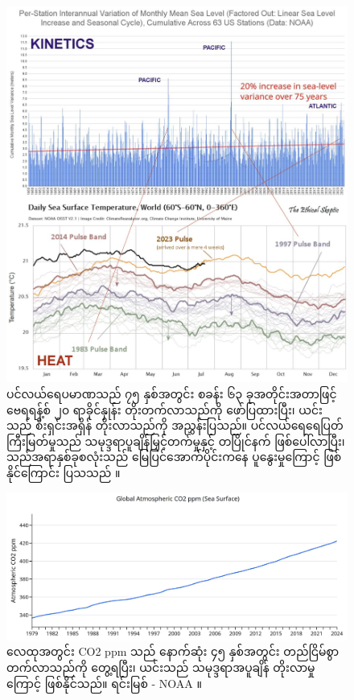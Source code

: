 \documentclass[10pt,twocolumn,letterpaper]{article}
\begin{document}
\begin{figure}[t]
\begin{center}
\includegraphics[width=1\textwidth]{sealevel.jpeg}
\end{center}
   \caption{ပင်လယ်ရေပမာဏသည် ၇၅ နှစ်အတွင်း စခန်း ၆၃ ခုအတိုင်းအတာဖြင့် ဗေရရန့်စ် ၂၀ ရာခိုင်နှုန်း တိုးတက်လာသည်ကို ဖော်ပြထားပြီး၊ ယင်းသည် စီးရှင်းအရှိန် တိုးလာသည်ကို အညွှန်းပြသည်။ ပင်လယ်ရေရေပြတ်ကြီးမြတ်မှုသည် သမုဒ္ဒရာပူချိန်မြှင့်တက်မှုနှင့် တပြိုင်နက် ဖြစ်ပေါ်လာပြီး၊ သည်အရာနှစ်ခုစလုံးသည် မြေပြင်အောက်ပိုင်းကနေ ပူနွေးမှုကြောင့် ဖြစ်နိုင်ကြောင်း ပြသသည် \cite{2,129}။}
\label{fig:22}
\end{figure}

\begin{figure}[t]
\begin{center}
\includegraphics[width=1\textwidth]{co2.jpg}
\end{center}
   \caption{လေထုအတွင်း CO2 ppm သည် နောက်ဆုံး ၄၅ နှစ်အတွင်း တည်ငြိမ်စွာ တက်လာသည်ကို တွေ့ရပြီး၊ ယင်းသည် သမုဒ္ဒရာအပူချိန် တိုးလာမှုကြောင့် ဖြစ်နိုင်သည်။ ရင်းမြစ် - NOAA \cite{148,129}။}
\label{fig:23}
\end{figure}
\end{document}
